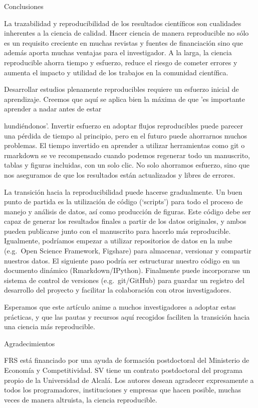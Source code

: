 \documentclass[]{tufte-handout}
\begin{document}
Conclusiones

La trazabilidad y reproducibilidad de los resultados científicos son
cualidades inherentes a la ciencia de calidad. Hacer ciencia de manera
reproducible no sólo es un requisito creciente en muchas revistas y
fuentes de financiación sino que además aporta muchas ventajas para el
investigador. A la larga, la ciencia reproducible ahorra tiempo y
esfuerzo, reduce el riesgo de cometer errores y aumenta el impacto y
utilidad de los trabajos en la comunidad científica.

Desarrollar estudios plenamente reproducibles requiere un esfuerzo
inicial de aprendizaje. Creemos que aquí se aplica bien la máxima de que
'es importante aprender a nadar antes de estar

hundiéndonos'. Invertir esfuerzo en adoptar flujos reproducibles puede
parecer una pérdida de tiempo al principio, pero en el futuro puede
ahorrarnos muchos problemas. El tiempo invertido en aprender a utilizar
herramientas como git o rmarkdown se ve recompensado cuando podemos
regenerar todo un manuscrito, tablas y figuras incluidas, con un solo
clic. No solo ahorramos esfuerzo, sino que nos aseguramos de que los
resultados están actualizados y libres de errores.

La transición hacia la reproducibilidad puede hacerse gradualmente. Un
buen punto de partida es la utilización de código (`scripts') para todo
el proceso de manejo y análisis de datos, así como producción de
figuras. Este código debe ser capaz de generar los resultados finales a
partir de los datos originales, y ambos pueden publicarse junto con el
manuscrito para hacerlo más reproducible. Igualmente, podríamos empezar
a utilizar repositorios de datos en la nube (e.g.~Open Science
Framework, Figshare) para almacenar, versionar y compartir nuestros
datos. El siguiente paso podría ser estructurar nuestro código en un
documento dinámico (Rmarkdown/IPython). Finalmente puede incorporarse un
sistema de control de versiones (e.g.~git/GitHub) para guardar un
registro del desarrollo del proyecto y facilitar la colaboración con
otros investigadores.

Esperamos que este artículo anime a muchos investigadores a adoptar
estas prácticas, y que las pautas y recursos aquí recogidos faciliten la
transición hacia una ciencia más reproducible.

Agradecimientos

FRS está financiado por una ayuda de formación postdoctoral del
Ministerio de Economía y Competitividad. SV tiene un contrato
postdoctoral del programa propio de la Universidad de Alcalá. Los
autores desean agradecer expresamente a todos los programadores,
instituciones y empresas que hacen posible, muchas veces de manera
altruista, la ciencia reproducible.
\end{document}
